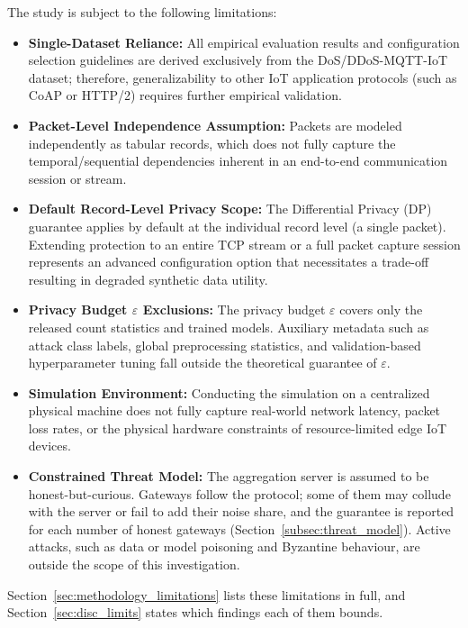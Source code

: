 The study is subject to the following limitations:
\begin{itemize}
    \item \textbf{Single-Dataset Reliance:} All empirical evaluation results and configuration selection guidelines are derived exclusively from the DoS/DDoS-MQTT-IoT dataset; therefore, generalizability to other IoT application protocols (such as CoAP or HTTP/2) requires further empirical validation.
    \item \textbf{Packet-Level Independence Assumption:} Packets are modeled independently as tabular records, which does not fully capture the temporal/sequential dependencies inherent in an end-to-end communication session or stream.
    \item \textbf{Default Record-Level Privacy Scope:} The Differential Privacy (DP) guarantee applies by default at the individual record level (a single packet). Extending protection to an entire TCP stream or a full packet capture session represents an advanced configuration option that necessitates a trade-off resulting in degraded synthetic data utility.
    \item \textbf{Privacy Budget $\varepsilon$ Exclusions:} The privacy budget $\varepsilon$ covers only the released count statistics and trained models. Auxiliary metadata such as attack class labels, global preprocessing statistics, and validation-based hyperparameter tuning fall outside the theoretical guarantee of $\varepsilon$.
    \item \textbf{Simulation Environment:} Conducting the simulation on a centralized physical machine does not fully capture real-world network latency, packet loss rates, or the physical hardware constraints of resource-limited edge IoT devices.
    \item \textbf{Constrained Threat Model:} The aggregation server is assumed to be honest-but-curious. Gateways follow the protocol; some of them may collude with the server or fail to add their noise share, and the guarantee is reported for each number of honest gateways (Section~\ref{subsec:threat_model}). Active attacks, such as data or model poisoning and Byzantine behaviour, are outside the scope of this investigation.
\end{itemize}
Section~\ref{sec:methodology_limitations} lists these limitations in full, and Section~\ref{sec:disc_limits} states which findings each of them bounds.

\clearpage
